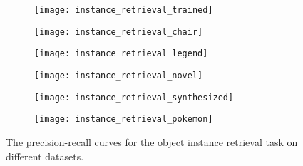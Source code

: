 \documentclass{article} %
\begin{document}
\begin{figure*}
  \centering
  \begin{subfigure}{0.3\linewidth}
  \texttt{[image: instance\_retrieval\_trained]}
  \caption{}
  \end{subfigure}
  \centering
  \begin{subfigure}{0.3\linewidth}
  \texttt{[image: instance\_retrieval\_chair]}
  \caption{}\label{fig:chair}
  \end{subfigure}
  \begin{subfigure}{0.15\linewidth}
  \texttt{[image: instance\_retrieval\_legend]}
  \end{subfigure}
  \par\medskip
  \centering
  \begin{subfigure}{0.3\linewidth}
  \texttt{[image: instance\_retrieval\_novel]}
  \caption{}
  \end{subfigure}
  \centering
  \begin{subfigure}{0.3\linewidth}
  \texttt{[image: instance\_retrieval\_synthesized]}
  \caption{}
  \end{subfigure}
  \centering
  \begin{subfigure}{0.3\linewidth}
  \texttt{[image: instance\_retrieval\_pokemon]}
  \caption{}
  \end{subfigure}
  
  \caption{The precision-recall curves for the object instance retrieval task on different datasets.}
  \label{fig:retrieval}
\end{figure*}




\end{document}
